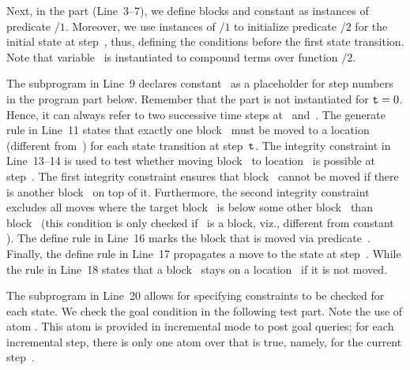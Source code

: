 Next, in the  part (Line~3--7),
we define blocks and constant 
as instances of predicate /$1$.
Moreover, we use instances of /$1$
to initialize predicate /$2$ for the initial state at step~, thus,
defining the conditions before the first state transition.
Note that variable~ is instantiated to compound terms
over function /$2$.

The  subprogram in Line~9 declares constant~ as a placeholder for step numbers in the program part below.
Remember that the  part is not instantiated for $\texttt{t}=0$.
Hence, it can always refer to two successive time steps at~ and~.
The generate rule in Line~11 states that exactly one block~ must be moved to a location~ (different from~) 
for each state transition at step~$\texttt{t}$.
The integrity constraint in Line~13--14 is used to test whether moving block~ to location~ is possible at step~.
The first integrity constraint ensures that block~ cannot be moved if there is another block~ on top of it.
Furthermore, the second integrity constraint excludes all moves where the target block~ is below some other block~ than block~
(this condition is only checked if~ is a block, viz., different from constant ).
The define rule in Line~16 marks the block that is moved via predicate~.
Finally, the define rule in Line~17 propagates a move to the state at step~.
While the rule in Line~18 states 
that a block~ stays on a location~ if it is not moved.

The subprogram  in Line~20 
allows for specifying constraints to be checked for each state.
We check the goal condition in the following test part.
Note the use of atom .
This atom is provided in incremental mode to post goal queries;
for each incremental step, there is only one atom over  that is true,
namely,  for the current step~.

